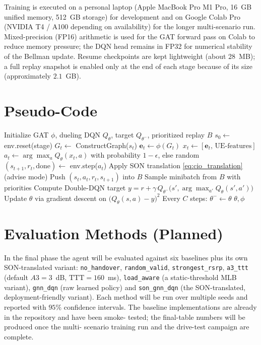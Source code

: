 \documentclass[12pt,a4paper,oneside]{report}
\begin{document}
Training is executed on a personal laptop (Apple MacBook Pro M1 Pro,
16~GB unified memory, 512~GB storage) for development and on Google
Colab Pro (NVIDIA T4 / A100 depending on availability) for the longer
multi-scenario run. Mixed-precision (FP16) arithmetic is used for the
GAT forward pass on Colab to reduce memory pressure; the DQN head
remains in FP32 for numerical stability of the Bellman update. Resume
checkpoints are kept lightweight (about $28$~MB); a full replay
snapshot is enabled only at the end of each stage because of its size
(approximately $2.1$~GB).

\section{Pseudo-Code}

\begin{algorithm}[H]
\caption{SON-GNN-DQN training procedure}
\label{alg:train}
\begin{algorithmic}[1]
\State Initialize GAT $\phi$, dueling DQN $Q_\theta$, target
$Q_{\theta^-}$, prioritized replay $B$
    \State $s_0 \gets$ env.reset(stage)
      \State $G_t \gets$ ConstructGraph($s_t$)
      \State $\mathbf{e}_t \gets \phi(G_t)$
      \State $x_t \gets [\mathbf{e}_t,\, \text{UE-features}]$
      \State $a_t \gets \arg\max_a Q_\theta(x_t, a)$ with probability
              $1-\epsilon$, else random
      \State $(s_{t+1}, r_t, \text{done}) \gets$ env.step($a_t$)
      \State Apply SON translation \eqref{eq:cio_translation}
      (advise mode)
      \State Push $(s_t, a_t, r_t, s_{t+1})$ into $B$
      \State Sample minibatch from $B$ with priorities
      \State Compute Double-DQN target
      $y = r + \gamma\, Q_{\theta^-}\!\big(s', \arg\max_{a'}
      Q_\theta(s', a')\big)$
      \State Update $\theta$ via gradient descent on
      $\big(Q_\theta(s,a) - y\big)^2$
      \State Every $C$ steps: $\theta^- \gets \theta$
    \EndFor
  \EndFor
\EndFor
\State \Return $\theta, \phi$
\end{algorithmic}
\end{algorithm}

\section{Evaluation Methods (Planned)}

In the final phase the agent will be evaluated against six baselines
plus its own SON-translated variant: \texttt{no\_handover},
\texttt{random\_valid}, \texttt{strongest\_rsrp}, \texttt{a3\_ttt}
(default $A3 = 3$~dB, $\mathrm{TTT} = 160$~ms),
\texttt{load\_aware} (a static-threshold MLB variant), \texttt{gnn\_dqn}
(raw learned policy) and \texttt{son\_gnn\_dqn} (the SON-translated,
deployment-friendly variant). Each method will be run over multiple
seeds and reported with $95\%$ confidence intervals. The baseline
implementations are already in the repository and have been smoke-
tested; the final-table numbers will be produced once the multi-
scenario training run and the drive-test campaign are complete.
\end{document}
